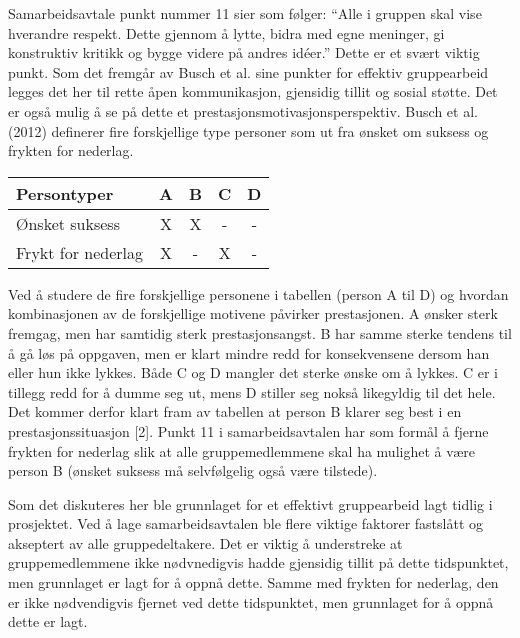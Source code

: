 Samarbeidsavtale punkt nummer 11 sier som følger:
“Alle i gruppen skal vise hverandre respekt. Dette gjennom å lytte, bidra med egne meninger, gi konstruktiv kritikk og bygge videre på andres idéer.”
Dette er et svært viktig punkt.
Som det fremgår av Busch et al. sine punkter for effektiv gruppearbeid legges det her til rette åpen kommunikasjon, gjensidig tillit og sosial støtte.
Det er også mulig å se på dette et prestasjonsmotivasjonsperspektiv.
Busch et al. (2012) definerer fire forskjellige type personer som ut fra ønsket om suksess og frykten for nederlag.

\begin{center}
	\begin{tabular}{|l|c|c|c|c|}
		\hline
		Persontyper & A & B & C & D \\ \hline
		Ønsket suksess & X & X & - & - \\ \hline
		Frykt for nederlag & X & - & X & - \\ \hline
	\end{tabular}
\end{center}

Ved å studere de fire forskjellige personene i tabellen (person A til D) og hvordan kombinasjonen av de forskjellige motivene påvirker prestasjonen.
A ønsker sterk fremgag, men har samtidig sterk prestasjonsangst.
B har samme sterke tendens til å gå løs på oppgaven, men er klart mindre redd for konsekvensene dersom han eller hun ikke lykkes.
Både C og D mangler det sterke ønske om å lykkes.
C er i tillegg redd for å dumme seg ut, mens D stiller seg nokså likegyldig til det hele.
Det kommer derfor klart fram av tabellen at person B klarer seg best i en prestasjonssituasjon [2].
Punkt 11 i samarbeidsavtalen har som formål å fjerne frykten for nederlag slik at alle gruppemedlemmene skal ha mulighet å være person B (ønsket suksess må selvfølgelig også være tilstede).

Som det diskuteres her ble grunnlaget for et effektivt gruppearbeid lagt tidlig i prosjektet.
Ved å lage samarbeidsavtalen ble flere viktige faktorer fastslått og akseptert av alle gruppedeltakere.
Det er viktig å understreke at gruppemedlemmene ikke nødvnedigvis hadde gjensidig tillit på dette tidspunktet, men grunnlaget er lagt for å oppnå dette.
Samme med frykten for nederlag, den er ikke nødvendigvis fjernet ved dette tidspunktet, men grunnlaget for å oppnå dette er lagt.
